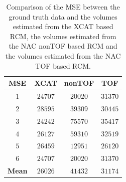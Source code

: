 \documentclass{IEEEtran}
\begin{document}
\begin{table}
    \vspace{-0.2cm}
    
    \centering
    \caption{Comparison of the MSE between the ground truth data and the volumes estimated from the XCAT based RCM, the volumes estimated from the NAC nonTOF based RCM and the volumes estimated from the NAC TOF based RCM.}
    
    \scalebox{1.3}
    {
        \begin{tabular}{||c|ccc||}
            \hline
                \textbf{MSE}    & \textbf{XCAT} & \textbf{nonTOF}   & \textbf{TOF}  \\
            \hline
                \textbf{$1$}    & $24707$       & $20020$           & $31370$       \\
                \textbf{$2$}    & $28595$       & $39309$           & $30445$       \\
                \textbf{$3$}    & $24242$       & $75570$           & $35417$       \\
                \textbf{$4$}    & $26127$       & $59310$           & $32519$       \\
                \textbf{$5$}    & $26459$       & $12951$           & $26120$       \\
                \textbf{$6$}    & $24707$       & $20020$           & $31370$       \\
            \hline
                \textbf{Mean}   & $26026$       & $41432$           & $31174$       \\
            \hline
        \end{tabular}
    }
    \label{tab:mse}
    
    \vspace{-0.2cm}
\end{table}
\end{document}
